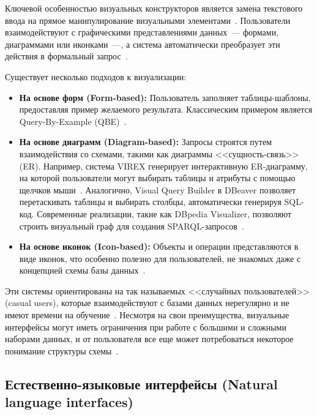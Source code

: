 Ключевой особенностью визуальных конструкторов является замена текстового ввода на прямое
манипулирование визуальными элементами~\cite{catarciVisualQuerySystems1996}. Пользователи
взаимодействуют с графическими представлениями данных~--- формами, диаграммами или иконками~---,
а система автоматически преобразует эти действия в формальный запрос~\cite{soumisVisualQueryBuilder2025,
	stigebornQueryBuilderDatabase2015}.

Существует несколько подходов к визуализации:
\begin{itemize}
	\item \textbf{На основе форм (Form-based):} Пользователь заполняет таблицы-шаблоны,
	      предоставляя пример желаемого результата. Классическим примером является
	      Query-By-Example (QBE)~\cite{catarciVisualQuerySystems1997}.
	\item \textbf{На основе диаграмм (Diagram-based):} Запросы строятся путем взаимодействия со схемами,
	      такими как диаграммы <<сущность-связь>> (ER). Например, система VIREX генерирует
	      интерактивную ER-диаграмму, на которой пользователи могут выбирать таблицы и
	      атрибуты с помощью щелчков мыши~\cite{loVIREXVRXQueryInteractive2010}.
	      Аналогично, Visual Query Builder в DBeaver позволяет перетаскивать
	      таблицы и выбирать столбцы, автоматически генерируя SQL-код.
	      Современные реализации, такие как DBpedia Visualizer,
	      позволяют строить визуальный граф для создания SPARQL-запросов~\cite{soumisVisualQueryBuilder2025}.
	\item \textbf{На основе иконок (Icon-based):} Объекты и операции представляются в виде иконок,
	      что особенно полезно для пользователей, не знакомых даже с
	      концепцией схемы базы данных~\cite{catarciVisualQuerySystems1997}.
\end{itemize}

Эти системы ориентированы на так называемых <<случайных пользователей>> (casual users),
которые взаимодействуют с базами данных нерегулярно и
не имеют времени на обучение~\cite{catarciVisualQuerySystems1997, catarciVisualQuerySystems1996}.
Несмотря на свои преимущества, визуальные интерфейсы могут иметь ограничения при работе
с большими и сложными наборами данных, и от пользователя все еще может потребоваться
некоторое понимание структуры схемы~\cite{baskaranSyntaticSemanticVisual2013}.




\subsection{Естественно-языковые интерфейсы (Natural language interfaces)}

